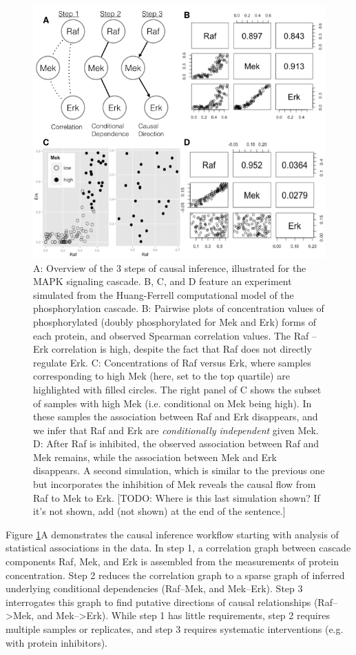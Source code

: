\documentclass[journal=jacsat,manuscript=article]{achemso}
\def\todo#1{{\color{red}[TODO: #1]}}
\def\added#1{{\color{blue} #1}}
\begin{document}
\begin{figure}[!tpb]
\centerline{\includegraphics[width=1\textwidth]{figs/mapk.png}}
\caption{A: Overview of the 3 steps of causal inference, illustrated for the MAPK signaling cascade.    B, C, and D feature an experiment simulated from the Huang-Ferrell computational model of the phosphorylation cascade.  B: Pairwise plots of concentration values of phosphorylated (doubly phosphorylated for Mek and Erk) forms of each protein, and observed Spearman correlation values.  The Raf -- Erk correlation is high, despite the fact that Raf does not directly regulate Erk.  C: Concentrations of Raf versus Erk, where samples corresponding to high Mek (here, set to the top quartile) are highlighted \added{with filled circles}.  The right panel of C shows the subset of samples with high Mek (i.e. conditional on Mek being high). In these samples the association between Raf and Erk disappears, \added{and we infer} that Raf and Erk are {\it conditionally independent} given Mek.  D: After Raf is inhibited, the observed association between Raf and Mek remains, while the association between Mek and Erk disappears. A second simulation, which is similar to the previous one but incorporates the inhibition of Mek reveals the causal flow from Raf to Mek to Erk. \todo{Where is this last simulation shown? If it's not shown, add (not shown) at the end of the sentence.}
\label{mapkInference}}
\end{figure}


Figure \ref{mapkInference}A demonstrates the causal inference workflow starting with analysis of statistical associations in the data.  In step 1, a correlation graph between cascade components Raf, Mek, and Erk is assembled from the measurements of protein concentration.  Step 2 reduces the correlation graph to a sparse graph of \added{inferred} underlying conditional dependencies (Raf--Mek, and Mek--Erk).  Step 3 interrogates this graph to find putative directions of causal relationships (Raf-->Mek, and Mek-->Erk).  While step 1 has little requirements, step 2 requires multiple samples or replicates, and step 3 requires systematic interventions (e.g. with protein inhibitors). 
\end{document}
